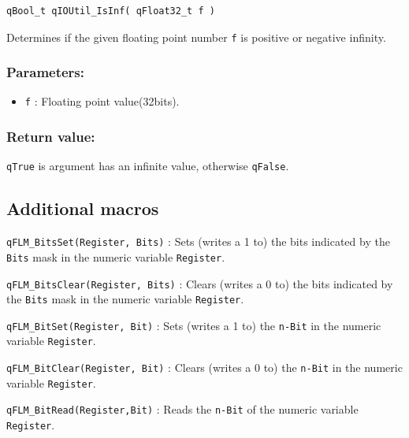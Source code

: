 \documentclass{article}
\begin{document}
\noindent\hrulefill

\begin{lstlisting}[style=CStyle]
qBool_t qIOUtil_IsInf( qFloat32_t f )
\end{lstlisting}

Determines if the given floating point number \lstinline{f} is positive or negative infinity. 

\subsubsection*{Parameters:}
\begin{itemize}
    \item \lstinline{f} : Floating point value(32bits).
\end{itemize}

\subsubsection*{Return value:}
\lstinline{qTrue} is argument has an infinite value, otherwise \lstinline{qFalse}.

\subsection{Additional macros}

\lstinline{qFLM_BitsSet(Register, Bits)} : Sets (writes a 1 to) the bits indicated by the \lstinline{Bits} mask in the numeric variable \lstinline{Register}.

\noindent\hrulefill

\lstinline{qFLM_BitsClear(Register, Bits)} : Clears (writes a 0 to) the bits indicated by the \lstinline{Bits} mask in the numeric variable \lstinline{Register}.

\noindent\hrulefill

\lstinline{qFLM_BitSet(Register, Bit)} : Sets (writes a 1 to) the \lstinline{n-Bit} in the numeric variable \lstinline{Register}.

\noindent\hrulefill

\lstinline{qFLM_BitClear(Register, Bit)} : Clears (writes a 0 to) the \lstinline{n-Bit} in the numeric variable \lstinline{Register}.

\noindent\hrulefill

\lstinline{qFLM_BitRead(Register,Bit)} : Reads the \lstinline{n-Bit} of the numeric variable \lstinline{Register}.

\noindent\hrulefill
\end{document}
